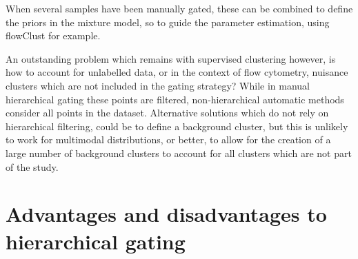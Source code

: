 When several samples have been manually gated, these can be combined to define the priors in the mixture model, so to guide the parameter estimation, using flowClust for example.

An outstanding problem which remains with supervised clustering however, is how to account for unlabelled data, or in the context of flow cytometry, nuisance clusters which are not included in the gating strategy?
While in manual hierarchical gating these points are filtered, non-hierarchical automatic methods consider all points in the dataset.
Alternative solutions which do not rely on hierarchical filtering, could be to define a background cluster, but this is unlikely to work for multimodal distributions, or better, to allow for the creation of a large number of background clusters to account for all clusters which are not part of the study.



\section{Advantages and disadvantages to hierarchical gating}

